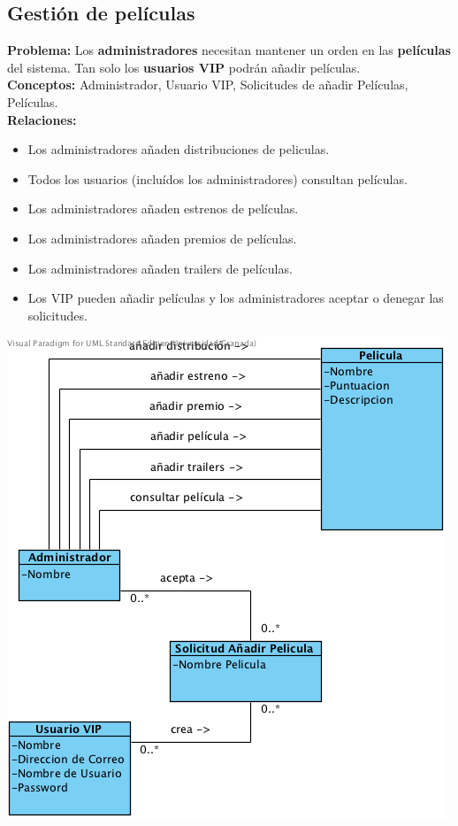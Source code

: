 \documentclass{article}
\begin{document}
	\subsection*{Gestión de películas}
	\textbf{Problema:} Los \textbf{administradores} necesitan mantener un orden en las \textbf{películas} del sistema.
	 Tan solo los \textbf{usuarios VIP} podrán añadir películas.\\
	\textbf{Conceptos:} Administrador, Usuario VIP, Solicitudes de añadir Películas, Películas.\\
	\textbf{	Relaciones:}
		\begin{itemize}
			\item Los administradores añaden distribuciones de peliculas.
			\item Todos los usuarios (incluídos los administradores) consultan películas.
			\item Los administradores añaden estrenos de películas.
			\item Los administradores añaden premios de películas.
			\item Los administradores añaden trailers de películas.
			\item Los VIP pueden añadir películas y los administradores aceptar o denegar las solicitudes.		
		\end{itemize}
	\includegraphics[width=0.7\linewidth]{./C-GestionDePeliculas}
	
	
\end{document}
